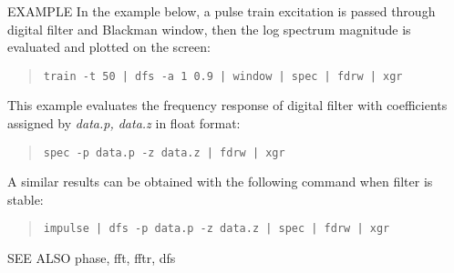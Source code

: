 \begin{qsection}{EXAMPLE}
In the example below, a pulse train excitation is passed
through digital filter and Blackman window,
then the log spectrum magnitude is evaluated and plotted
on the screen:
\begin{quote}
  \verb!train -t 50 | dfs -a 1 0.9 | window | spec | fdrw | xgr !
\end{quote}
\par
This example evaluates the frequency response of
digital filter with coefficients assigned by {\em data.p, data.z}
in float format:
\begin{quote}
  \verb!spec -p data.p -z data.z | fdrw | xgr !
\end{quote}
A similar results can be obtained with the following command
when filter is stable:
\begin{quote}
  \verb!impulse | dfs -p data.p -z data.z | spec | fdrw | xgr !
\end{quote}
\end{qsection}

\begin{qsection}{SEE ALSO}
  phase, fft, fftr, dfs
\end{qsection}
